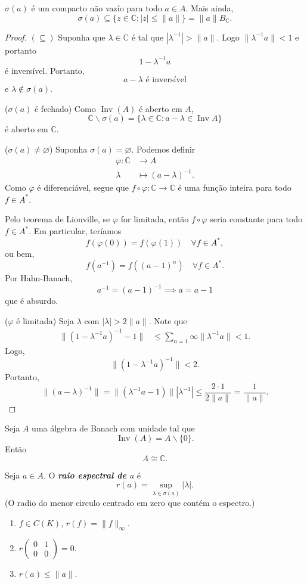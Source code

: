 \documentclass[portuguese]{article}
\theoremstyle{definition}
\newcommand{\C}{\mathbb{C}}
\begin{document}
\begin{teo}[Gelfand]
	$\sigma(a)$ é um compacto não vazío para todo $a\in A$. Mais ainda,
	\[\sigma(a)\subseteq\{z\in\C:|z|\leq\|a\|\}=\|a\|B_{\C}.\]
\end{teo}
\begin{proof}
	$(\subseteq)$ Suponha que $\lambda\in\C$ é tal que $|\lambda^{-1}|>\|a\|$. Logo $\|\lambda^{-1}a\|<1$ e portanto
	\[1-\lambda^{-1}a\]
	é inversível. Portanto,
	\[a-\lambda\text{ é inversível}\]
	e $\lambda\notin\sigma(a)$.
	
	($\sigma(a)$ é fechado) Como $\operatorname{Inv}(A)$ é aberto em $A$,
	\[\C\backslash\sigma(a)=\{\lambda\in\C:a-\lambda\in\operatorname{Inv}A\}\]
	é aberto em $\C$.
	
	($\sigma(a)\neq\varnothing$) Suponha $\sigma(a)=\varnothing$. Podemos definir
	\begin{align*}
		\varphi:\C&\to A\\
		\lambda&\mapsto(a-\lambda)^{-1}.
	\end{align*}
	Como $\varphi$ é diferenciável, segue que $f\circ\varphi:\C\to\C$ é uma função inteira para todo $f\in A^*$.
	
	Pelo teorema de Liouville, se $\varphi$ for limitada, então $f\circ\varphi$ seria constante para todo $f\in A^*$. Em particular, teríamos
	\[f(\varphi(0))=f(\varphi(1))\quad\forall f\in A^*,\]
	ou bem,
	\[f(a^{-1})=f((a-1)^n)\quad\forall f\in A^*.\]
	Por Hahn-Banach,
	\[a^{-1}=(a-1)^{-1}\implies a=a-1\]
	que é absurdo.
	
	($\varphi$ é limitada) Seja $\lambda$ com $|\lambda|>2\|a\|$. Note que
	\begin{align*}
		\|(1-\lambda^{-1}a)^{-1}-1\|&\leq\sum_{n=1}\infty\|\lambda^{-1}a\|<1.
	\end{align*}
	Logo,
	\[\|(1-\lambda^{-1}a)^{-1}\|<2.\]
	Portanto,
	\[\|(a-\lambda)^{-1}\|=\|(\lambda^{-1}a-1)\||\lambda^{-1}|\leq\frac{2\cdot 1}{2\|a\|}=\frac{1}{\|a\|}.\]
\end{proof}
\begin{coro}
	Seja $A$ uma álgebra de Banach com unidade tal que
	\[\operatorname{Inv}(A)=A\backslash\{0\}.\]
	Então
	\[A\cong\C.\]
\end{coro}
\begin{defn}
	Seja $a\in A$. O \textbf{\textit{raio espectral de $a$}} é
	\[r(a)=\sup_{\lambda\in\sigma(a)}|\lambda|.\]
	(O radio do menor circulo centrado em zero que contém o espectro.)
\end{defn}
\begin{exemplos}\leavevmode
	\begin{enumerate}
		\item $f\in C(K)$, $r(f)=\|f\|_\infty$.
		\item $r\begin{pmatrix}
			0&1\\0&0
		\end{pmatrix}=0$.
		\item $r(a)\leq\|a\|$.
	\end{enumerate}
\end{exemplos}
\end{document}
